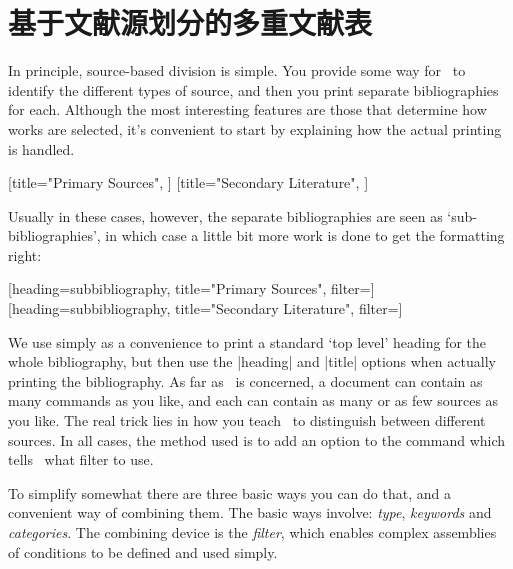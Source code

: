 \section{基于文献源划分的多重文献表}

In principle, source-based division is simple. You provide some way for
\biblatex\ to identify the different types of source, and then you print
separate bibliographies for each. Although the most interesting features
are those that determine how works are selected, it's convenient to start
by explaining how the actual printing is handled.

\begin{pseudoverb}
[title="Primary Sources",
                       ]
[title="Secondary Literature",
                       ]
\end{pseudoverb}
Usually in these cases, however, the separate bibliographies are seen
as `sub-bibliographies', in which case a little bit more work is
done to get the formatting right:

\begin{pseudoverb}
 [heading=subbibliography,
                      title="Primary Sources",
                      filter=]
 [heading=subbibliography,
                      title="Secondary Literature",
                      filter=]
\end{pseudoverb}
We use  simply as a convenience to print a
standard `top level' heading for the whole bibliography, but then use
the |heading| and |title| options when actually printing the
bibliography. As far as \biblatex\ is concerned, a document can contain
as many  commands as you
like, and each can contain as many or as few sources as you like.  The
real trick lies in how you teach \biblatex\ to distinguish between
different sources. In all cases, the method used is to add an option
to the  command which tells
\biblatex\ what filter to use.

To simplify somewhat there are three basic ways you can do that, and a
convenient way of combining them. The basic ways involve:
\emph{type}, \emph{keywords} and \emph{categories}. The
combining device is the \emph{filter}, which enables complex
assemblies of conditions to be defined and used simply.

